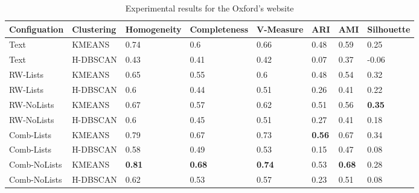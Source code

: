 \begin{landscape}
\begin{table}[h]
\centering
\caption{Experimental results for the Oxford's website}
\label{tab:oxford}
\begin{tabular}{|l|l|l|l|l|l|l|l|}
\hline
Configuation  & Clustering & Homogeneity & Completeness & V-Measure & ARI & AMI & Silhouette \\ \hline \hline
Text & KMEANS & 0.74 & 0.6 & 0.66 & 0.48 & 0.59 & 0.25\\ \hline
Text & H-DBSCAN & 0.43 & 0.41 & 0.42 & 0.07 & 0.37 & -0.06\\ \hline
\hline
RW-Lists & KMEANS & 0.65 & 0.55 & 0.6 & 0.48 & 0.54 & 0.32\\ \hline
RW-Lists &  H-DBSCAN & 0.6 & 0.44 & 0.51 & 0.26 & 0.41 & 0.22\\ \hline
RW-NoLists & KMEANS & 0.67 & 0.57 & 0.62 & 0.51 & 0.56 & \textbf{0.35}\\ \hline
RW-NoLists & H-DBSCAN & 0.6 & 0.45 & 0.51 & 0.27 & 0.41 & 0.18\\ \hline
\hline
Comb-Lists &  KMEANS & 0.79 & 0.67 & 0.73 & \textbf{0.56} & 0.67 & 0.34\\ \hline
Comb-Lists & H-DBSCAN & 0.58 & 0.49 & 0.53 & 0.15 & 0.47 & 0.08\\ \hline
Comb-NoLists &  KMEANS & \textbf{0.81} & \textbf{0.68} & \textbf{0.74} & 0.53 & \textbf{0.68} & 0.28\\ \hline
Comb-NoLists & H-DBSCAN & 0.62 & 0.53 & 0.57 & 0.23 & 0.51 & 0.08\\ \hline
\end{tabular}
\end{table}


\end{landscape}
